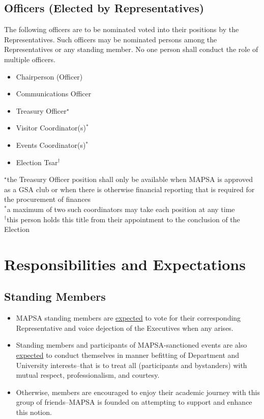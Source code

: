 \documentclass[8pt]{article}
\begin{document}
	\subsection{Officers (Elected by Representatives)}
	The following officers are to be nominated voted into their positions by the Representatives. Such officers may be nominated persons among the Representatives or any standing member. No one person shall conduct the role of multiple officers.
	\begin{itemize}
		\item Chairperson (Officer)
		\item Communications Officer
		\item Treasury Officer$^\star$
		\item Visitor Coordinator(s)$^*$
		\item Events Coordinator(s)$^*$
		\item Election Tsar$^\dagger$
	\end{itemize}
	$^\star$the Treasury Officer position shall only be available when MAPSA is approved as a GSA club or when there is otherwise financial reporting that is required for the procurement of finances\\
	$^*$a maximum of two such coordinators may take each position at any time\\
	$^\dagger$this person holds this title from their appointment to the conclusion of the Election
	
	\section{Responsibilities and Expectations}
	\subsection{Standing Members}
	\begin{itemize}
		\item MAPSA standing members are \underline{expected} to vote for their corresponding Representative and voice dejection of the Executives when any arises. 
		\item Standing members and participants of MAPSA-sanctioned events are also \underline{expected} to conduct themselves in manner befitting of Department and University interests--that is to treat all (participants and bystanders) with mutual respect, professionalism, and courtesy. 
		\item Otherwise, members are encouraged to enjoy their academic journey with this group of friends--MAPSA is founded on attempting to support and enhance this notion.
	\end{itemize}
\end{document}
